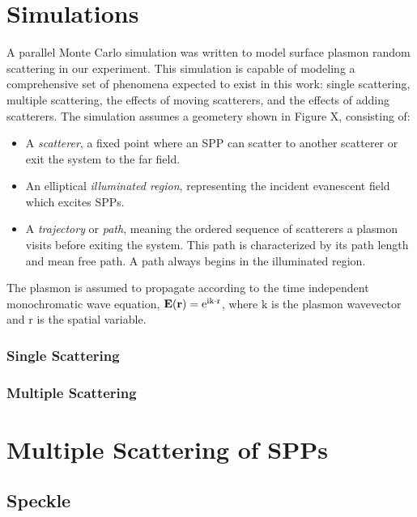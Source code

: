\documentclass[a4paper,titlepage,onecolumn]{report}
\begin{document}
\chapter{Simulations}
A parallel Monte Carlo simulation was written to model surface plasmon
random scattering in our experiment. This simulation is capable of modeling
a comprehensive set of phenomena expected to exist in this work: single
scattering, multiple scattering, the effects of moving scatterers, and the
effects of adding scatterers. The simulation assumes a geometery shown in
Figure X, consisting of:

\begin{itemize}

\item A \textit{scatterer}, a fixed point where an SPP can scatter to
another scatterer or exit the system to the far field.

\item An elliptical \textit{illuminated region}, representing the incident
evanescent field which excites SPPs.

\item A \textit{trajectory} or \textit{path}, meaning the ordered sequence
of scatterers a plasmon visits before exiting the system. This path is
characterized by its path length and mean free path. A path always begins
in the illuminated region.

\end{itemize}

The plasmon is assumed to propagate according to the time independent
monochromatic wave equation, $\mathbf{E}(\mathbf{r})={\mathrm{e}}^{{\mathrm{i}}
\mathrm{k}\cdot \mathrm{r}}$, where $\mathrm{k}$ is the plasmon wavevector
and $\mathrm{r}$ is the spatial variable.

\subsection{Single Scattering}

\subsection{Multiple Scattering}
 

\chapter{Multiple Scattering of SPPs}
\section{Speckle}
\end{document}
